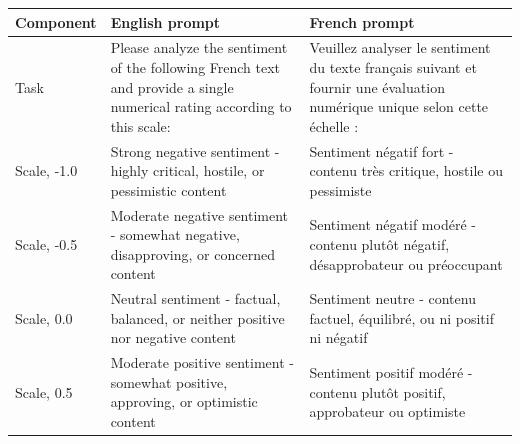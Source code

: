 \documentclass[
  man,
  floatsintext,
  longtable,
  nolmodern,
  notxfonts,
  notimes,
  mask,
  colorlinks=true,linkcolor=blue,citecolor=blue,urlcolor=blue]{apa7}
\begin{document}
\begin{table}

{\caption{{Wording of the English and French Prompts on French Text, by
Component. Both Were Preceded by the Same English System Prompt: ``You
are a helpful assistant that analyzes the sentiment of text. You provide
accurate and consistent sentiment ratings according to the specified
scale.'' The English Prompt on the English Translation Differs Only in
Referring to English Instead of French (Task and Instruction
1).}{\label{tbl-prompt}}}
\vspace{-20pt}}

\begin{longtable}[]{@{}
  >{\raggedright\arraybackslash}p{}
  >{\raggedright\arraybackslash}p{}
  >{\raggedright\arraybackslash}p{}@{}}
\toprule\noalign{}
\begin{minipage}[b]{\linewidth}\raggedright
Component
\end{minipage} & \begin{minipage}[b]{\linewidth}\raggedright
English prompt
\end{minipage} & \begin{minipage}[b]{\linewidth}\raggedright
French prompt
\end{minipage} \\
\midrule\noalign{}
\endhead
\bottomrule\noalign{}
\endlastfoot
Task & Please analyze the sentiment of the following French text and
provide a single numerical rating according to this scale: & Veuillez
analyser le sentiment du texte français suivant et fournir une
évaluation numérique unique selon cette échelle : \\
Scale, -1.0 & Strong negative sentiment - highly critical, hostile, or
pessimistic content & Sentiment négatif fort - contenu très critique,
hostile ou pessimiste \\
Scale, -0.5 & Moderate negative sentiment - somewhat negative,
disapproving, or concerned content & Sentiment négatif modéré - contenu
plutôt négatif, désapprobateur ou préoccupant \\
Scale, 0.0 & Neutral sentiment - factual, balanced, or neither positive
nor negative content & Sentiment neutre - contenu factuel, équilibré, ou
ni positif ni négatif \\
Scale, 0.5 & Moderate positive sentiment - somewhat positive, approving,
or optimistic content & Sentiment positif modéré - contenu plutôt
positif, approbateur ou optimiste \\

\end{longtable}
\end{table}
\end{document}
